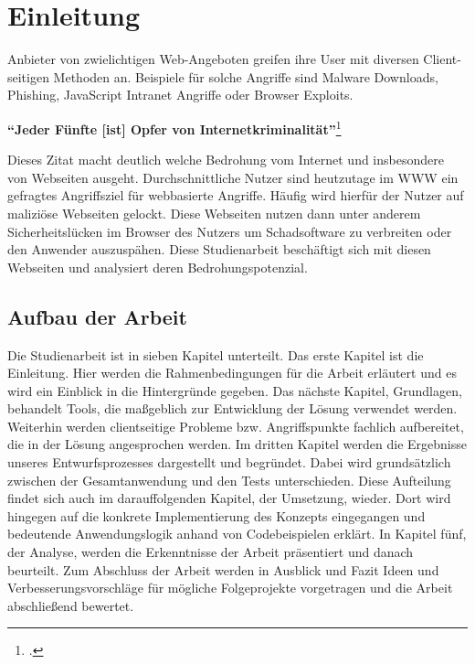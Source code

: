 \chapter{Einleitung}

Anbieter von zwielichtigen Web-Angeboten greifen ihre User mit diversen Client-seitigen Methoden an. Beispiele für solche Angriffe sind Malware Downloads, Phishing, JavaScript Intranet Angriffe oder Browser Exploits.

\begin{center}
\textbf{\enquote{Jeder Fünfte [ist] Opfer von Internetkriminalität}}\footcite[Zitat][297]{cybercrime}
\end{center}

Dieses Zitat macht deutlich welche Bedrohung vom Internet und insbesondere von Webseiten ausgeht. Durchschnittliche Nutzer sind heutzutage im \ac{WWW} ein gefragtes Angriffsziel für webbasierte Angriffe. Häufig wird hierfür der Nutzer auf maliziöse Webseiten gelockt. Diese Webseiten nutzen dann unter anderem Sicherheitslücken im Browser des Nutzers um Schadsoftware zu verbreiten oder den Anwender auszuspähen. Diese Studienarbeit beschäftigt sich mit diesen Webseiten und analysiert deren Bedrohungspotenzial.

\section{Aufbau der Arbeit}

Die Studienarbeit ist in sieben Kapitel unterteilt. Das erste Kapitel ist die Einleitung. Hier werden die Rahmenbedingungen für die Arbeit erläutert und es wird ein Einblick in die Hintergründe gegeben. Das nächste Kapitel, Grundlagen, behandelt Tools, die maßgeblich zur Entwicklung der Lösung verwendet werden. Weiterhin werden clientseitige Probleme bzw. Angriffspunkte fachlich aufbereitet, die in der Lösung angesprochen werden. Im dritten Kapitel werden die Ergebnisse unseres Entwurfsprozesses dargestellt und begründet. Dabei wird grundsätzlich zwischen der Gesamtanwendung und den Tests unterschieden. Diese Aufteilung findet sich auch im darauffolgenden Kapitel, der Umsetzung, wieder. Dort wird hingegen auf die konkrete Implementierung des Konzepts eingegangen und bedeutende Anwendungslogik anhand von Codebeispielen erklärt. In Kapitel fünf, der Analyse, werden die Erkenntnisse der Arbeit präsentiert und danach beurteilt. Zum Abschluss der Arbeit werden in Ausblick und Fazit Ideen und Verbesserungsvorschläge für mögliche Folgeprojekte vorgetragen und die Arbeit abschließend bewertet.

